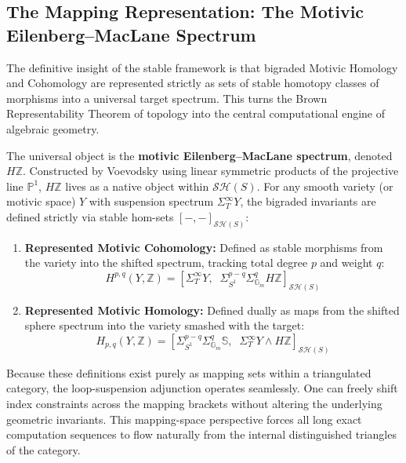 \documentclass[11pt,oneside]{article}
\begin{document}
\subsection{The Mapping Representation: The Motivic Eilenberg--MacLane Spectrum}
The definitive insight of the stable framework is that bigraded Motivic Homology and Cohomology are represented strictly as sets of stable homotopy classes of morphisms into a universal target spectrum. This turns the Brown Representability Theorem of topology into the central computational engine of algebraic geometry.

The universal object is the \textbf{motivic Eilenberg--MacLane spectrum}, denoted $H\mathbb{Z}$. Constructed by Voevodsky using linear symmetric products of the projective line $\mathbb{P}^1$, $H\mathbb{Z}$ lives as a native object within $\mathcal{S}\mathcal{H}(S)$. For any smooth variety (or motivic space) $Y$ with suspension spectrum $\Sigma_T^\infty Y$, the bigraded invariants are defined strictly via stable hom-sets $[-, -]_{\mathcal{S}\mathcal{H}(S)}$:
\begin{enumerate}
    \item \textbf{Represented Motivic Cohomology:} Defined as stable morphisms from the variety into the shifted spectrum, tracking total degree $p$ and weight $q$:
    \[ H^{p,q}(Y, \mathbb{Z}) = \left[ \Sigma_T^\infty Y, \;\; \Sigma_{S^1}^{p-q}\Sigma_{\mathbb{G}_m}^q H\mathbb{Z} \right]_{\mathcal{S}\mathcal{H}(S)} \]
    \item \textbf{Represented Motivic Homology:} Defined dually as maps from the shifted sphere spectrum into the variety smashed with the target:
    \[ H_{p,q}(Y, \mathbb{Z}) = \left[ \Sigma_{S^1}^{p-q}\Sigma_{\mathbb{G}_m}^q \mathbb{S}, \;\; \Sigma_T^\infty Y \wedge H\mathbb{Z} \right]_{\mathcal{S}\mathcal{H}(S)} \]
\end{enumerate}

Because these definitions exist purely as mapping sets within a triangulated category, the loop-suspension adjunction operates seamlessly. One can freely shift index constraints across the mapping brackets without altering the underlying geometric invariants. This mapping-space perspective forces all long exact computation sequences to flow naturally from the internal distinguished triangles of the category.
\end{document}
